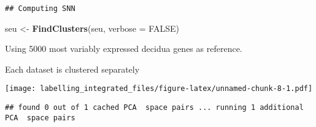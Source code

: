 \documentclass[]{article}
\newenvironment{Shaded}{\begin{snugshade}}{\end{snugshade}}
\newcommand{\CommentTok}[1]{\textcolor[rgb]{0.56,0.35,0.01}{\textit{#1}}}
\newcommand{\DataTypeTok}[1]{\textcolor[rgb]{0.13,0.29,0.53}{#1}}
\newcommand{\DecValTok}[1]{\textcolor[rgb]{0.00,0.00,0.81}{#1}}
\newcommand{\KeywordTok}[1]{\textcolor[rgb]{0.13,0.29,0.53}{\textbf{#1}}}
\newcommand{\NormalTok}[1]{#1}
\newcommand{\OperatorTok}[1]{\textcolor[rgb]{0.81,0.36,0.00}{\textbf{#1}}}
\newcommand{\OtherTok}[1]{\textcolor[rgb]{0.56,0.35,0.01}{#1}}
\newcommand{\StringTok}[1]{\textcolor[rgb]{0.31,0.60,0.02}{#1}}
\begin{document}
\begin{verbatim}
## Computing SNN
\end{verbatim}

\begin{Shaded}
\begin{Highlighting}[]
\NormalTok{seu <-}\StringTok{ }\KeywordTok{FindClusters}\NormalTok{(seu, }\DataTypeTok{verbose =} \OtherTok{FALSE}\NormalTok{)}
\end{Highlighting}
\end{Shaded}

Using 5000 most variably expressed decidua genes as reference.

Each dataset is clustered separately

\begin{Shaded}
\end{Shaded}

\texttt{[image: labelling\_integrated\_files/figure-latex/unnamed-chunk-8-1.pdf]}

\begin{Shaded}
\end{Shaded}

\begin{verbatim}
## found 0 out of 1 cached PCA  space pairs ... running 1 additional PCA  space pairs
\end{verbatim}
\end{document}

